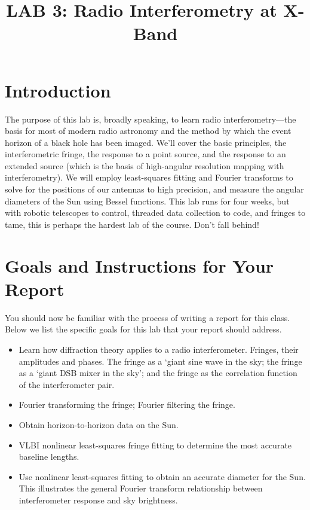 \documentclass[11pt,preprint]{aastex}
\begin{document}
\def\simlt{\lower.5ex\hbox{$\; \buildrel < \over \sim \;$}}
\def\simgt{\lower.5ex\hbox{$\; \buildrel > \over \sim \;$}}


\title {LAB 3: Radio Interferometry at X-Band}

\tableofcontents

\section{Introduction}

\noindent
The purpose of this lab is, broadly speaking, to learn radio
interferometry---the basis for most of modern radio astronomy and
the method by which the event horizon of a black hole has been imaged. 
We'll cover the
basic principles, the interferometric fringe, the response to a point
source, and the response to an extended source (which is the basis of
high-angular resolution mapping with interferometry). We will employ
least-squares fitting and Fourier transforms to solve for the positions
of our antennas to high precision, and measure 
the angular diameters of the Sun using Bessel functions.
This lab runs for four weeks, but with robotic telescopes to control,
threaded data collection to code, and fringes to tame, this is perhaps
the hardest lab of the course. Don't fall behind!

\section{Goals and Instructions for Your Report}

\noindent
You should now be familiar with the process of writing a report
for this class. Below we list the specific goals for this lab that
your report should address.

\begin{itemize}

\item Learn how diffraction theory applies to a radio
  interferometer. Fringes, their amplitudes and phases. The fringe as a
  `giant sine wave in the sky; the fringe as a `giant DSB mixer in
  the sky'; and the fringe as the correlation function of the
  interferometer pair.

\item Fourier transforming the fringe; Fourier filtering the fringe.

\item Obtain horizon-to-horizon data on the Sun.

\item VLBI nonlinear least-squares fringe fitting to determine the most
  accurate baseline lengths.

\item Use nonlinear least-squares fitting to obtain an accurate diameter
  for the Sun. This illustrates the general Fourier transform
  relationship between interferometer response and sky brightness.

\end{itemize}
\end{document}
